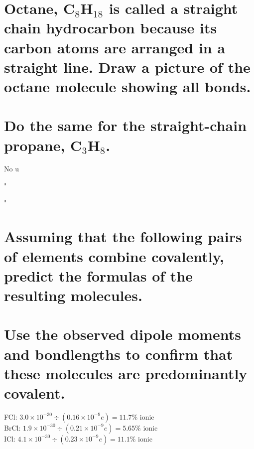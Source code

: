 \documentclass[answers]{exam}
\begin{document}
\begin{questions}
\question{}

\begin{parts}
	\part{Octane, C$_8$H$_{18}$ is called a straight chain hydrocarbon because its carbon atoms are arranged in a straight line. Draw a picture of the octane molecule showing all bonds.}
	\part{Do the same for the straight-chain propane, C$_3$H$_8$.}
\end{parts}

\begin{solution}
	No u
\end{solution}


\begin{solution}
	"
\end{solution}


\begin{solution}
	"
\end{solution}

\question{}

\begin{parts}
	\part{Assuming that the following pairs of elements combine covalently, predict the formulas of the resulting molecules.}
	\part{Use the observed dipole moments and bondlengths to confirm that these molecules are predominantly covalent.}
\end{parts}

\begin{solution}
	FCl: $3.0\times10^{-30}\div(0.16\times10^{-9}e) = 11.7\%$ ionic \\
	BrCl: $1.9\times10^{-30}\div(0.21\times10^{-9}e) = 5.65\%$ ionic \\
	ICl: $4.1\times10^{-30}\div(0.23\times10^{-9}e) = 11.1\%$ ionic
\end{solution}


\end{questions}
\end{document}
